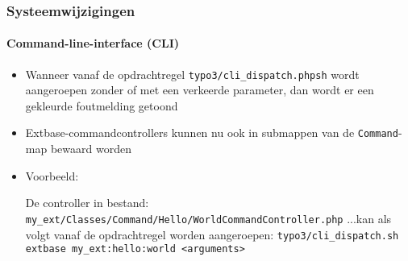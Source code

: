 \begin{frame}[fragile]
	\frametitle{Systeemwijzigingen}
	\framesubtitle{Command-line-interface (CLI)}

	\lstset{basicstyle=\tiny\ttfamily}

	\begin{itemize}

		\item Wanneer vanaf de opdrachtregel \texttt{typo3/cli\_dispatch.phpsh} wordt aangeroepen
			zonder of met een verkeerde parameter, dan wordt er een gekleurde foutmelding getoond

		\item Extbase-commandcontrollers kunnen nu ook in submappen van de \texttt{Command}-map
			bewaard worden

		\item Voorbeeld:\newline

			De controller in bestand:\newline
			\smaller\texttt{my\_ext/Classes/Command/Hello/WorldCommandController.php}\normalsize\newline
			...kan als volgt vanaf de opdrachtregel worden aangeroepen:\newline
			\smaller\texttt{typo3/cli\_dispatch.sh extbase my\_ext:hello:world <arguments>}\normalsize

	\end{itemize}

\end{frame}


